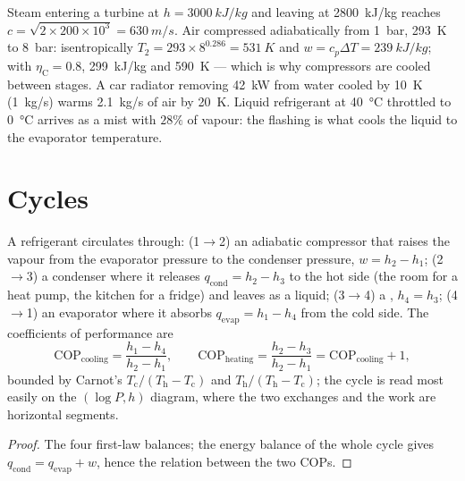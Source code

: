 \begin{example}\label{ex:b2:open-systems:numbers}
Steam entering a turbine  at $h = \qty{3000}{kJ/kg}$ and leaving
at \qty{2800}{kJ/kg} reaches $c = \sqrt{2 \times 200 \times 10^3} =
\qty{630}{m/s}$. Air compressed adiabatically from \qty{1}{bar},
\qty{293}{K} to \qty{8}{bar}: isentropically $T_2 = 293 \times 8^{0.286} =
\qty{531}{K}$ and $w = c_p\Delta T = \qty{239}{kJ/kg}$; with $\eta_{\text{C}} =
0.8$, \qty{299}{kJ/kg} and \qty{590}{K} --- which is why compressors are
cooled between stages. A car radiator removing \qty{42}{kW} from water
cooled by \qty{10}{K} (\qty{1}{kg/s}) warms \qty{2.1}{kg/s} of air by
\qty{20}{K}. Liquid refrigerant at \qty{40}{\celsius} throttled to
\qty{0}{\celsius} arrives as a mist with $28\%$ of vapour: the flashing
is what cools the liquid to the evaporator temperature.
\end{example}

\section{Cycles}

\begin{proposition}\label{prop:b2:open-systems:fridge}
A refrigerant circulates through: (1$\to$2) an adiabatic compressor
that raises the vapour from the evaporator pressure to the condenser
pressure, $w = h_2 - h_1$; (2$\to$3) a condenser where it releases
$q_{\text{cond}} = h_2 - h_3$ to the hot side (the room for a heat pump, the
kitchen for a fridge) and leaves as a liquid; (3$\to$4) a , $h_4
= h_3$; (4$\to$1) an evaporator where it absorbs $q_{\text{evap}} = h_1 - h_4$
from the cold side. The coefficients of performance are
\[
\mathrm{COP}_{\text{cooling}} = \frac{h_1 - h_4}{h_2 - h_1}, \qquad
\mathrm{COP}_{\text{heating}} = \frac{h_2 - h_3}{h_2 - h_1} = \mathrm{COP}_{\text{cooling}} + 1 ,
\]
bounded by Carnot's $T_{\text{c}}/(T_{\text{h}} - T_{\text{c}})$ and
$T_{\text{h}}/(T_{\text{h}} - T_{\text{c}})$; the cycle is read most easily on
the $(\log P, h)$ diagram, where the two exchanges and the work are
horizontal segments.
\end{proposition}

\begin{proof}
The four first-law balances; the energy balance of the whole cycle
gives $q_{\text{cond}} = q_{\text{evap}} + w$, hence the relation between
the two COPs.
\end{proof}

